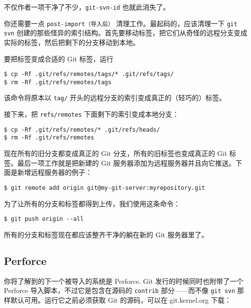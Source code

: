 \documentclass[a4paper]{book}
\begin{document}
不仅作者一项干净了不少，\texttt{git-svn-id} 也就此消失了。

你还需要一点 \texttt{post-import（导入后）} 清理工作。最起码的，应该清理一下 \texttt{git svn} 创建的那些怪异的索引结构。首先要移动标签，把它们从奇怪的远程分支变成实际的标签，然后把剩下的分支移动到本地。

要把标签变成合适的 Git 标签，运行

\begin{shaded}\begin{verbatim}
$ cp -Rf .git/refs/remotes/tags/* .git/refs/tags/
$ rm -Rf .git/refs/remotes/tags
\end{verbatim}\end{shaded}

该命令将原本以 \texttt{tag/} 开头的远程分支的索引变成真正的（轻巧的）标签。

接下来，把 \texttt{refs/remotes} 下面剩下的索引变成本地分支：

\begin{shaded}\begin{verbatim}
$ cp -Rf .git/refs/remotes/* .git/refs/heads/
$ rm -Rf .git/refs/remotes
\end{verbatim}\end{shaded}

现在所有的旧分支都变成真正的 Git 分支，所有的旧标签也变成真正的 Git 标签。最后一项工作就是把新建的 Git 服务器添加为远程服务器并且向它推送。下面是新增远程服务器的例子：

\begin{shaded}\begin{verbatim}
$ git remote add origin git@my-git-server:myrepository.git
\end{verbatim}\end{shaded}

为了让所有的分支和标签都得到上传，我们使用这条命令：

\begin{shaded}\begin{verbatim}
$ git push origin --all
\end{verbatim}\end{shaded}

所有的分支和标签现在都应该整齐干净的躺在新的 Git 服务器里了。

\subsection{Perforce}

你将了解到的下一个被导入的系统是 Perforce. Git 发行的时候同时也附带了一个 Perforce 导入脚本，不过它是包含在源码的 \texttt{contrib} 部分------而不像 \texttt{git svn} 那样默认可用。运行它之前必须获取 Git 的源码，可以在 git.kernel.org 下载：
\end{document}
